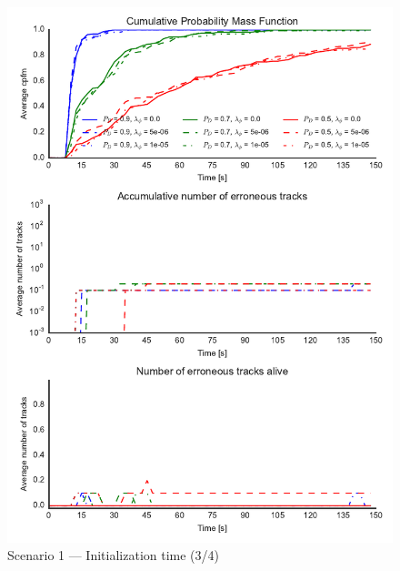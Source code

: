 \begin{figure}
\centering
\includegraphics{Figures/plots/Scenario1_Init-Time(3-4).pdf}
\caption{Scenario 1 --- Initialization time (3/4)}\label{fig:init1_time_3-4}
\end{figure}

